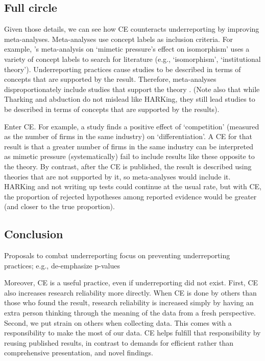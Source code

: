 \documentclass[empirical, authordate, meta]{jote-new-article}
\begin{document}
\subsection{Full circle}

Given those details, we can see how CE counteracts underreporting by improving meta-analyses. Meta-analyses use concept labels as inclusion criteria. For example, \textcite{Heugens2009}'s meta-analysis on ‘mimetic pressure's effect on isomorphism' uses a variety of concept labels to search for literature (e.g., ‘isomorphism', ‘institutional theory'). Underreporting practices cause studies to be described in terms of concepts that are supported by the result. Therefore, meta-analyses disproportionately include studies that support the theory \parencite{Murphy2019}. (Note also that while Tharking \parencite{Hollenbeck2017} and abduction \parencite{Locke2008, Schwab2017} do not mislead like HARKing, they still lead studies to be described in terms of concepts that are supported by the results). 

Enter CE. For example, a study finds a positive effect of ‘competition' (measured as the number of firms in the same industry) on ‘differentiation'. A CE for that result is that a greater number of firms in the same industry can be interpreted as mimetic pressure \parencite[][e,.,g,.]{Haveman1993}(systematically) fail to include results like these opposite to the theory. By contrast, after the CE is published, the result is described using theories that are not supported by it, so meta-analyses would include it. HARKing and not writing up tests could continue at the usual rate, but with CE, the proportion of rejected hypotheses among reported evidence would be greater (and closer to the true proportion).



\subsection{Conclusion}

Proposals to combat underreporting focus on preventing underreporting practices; e.g., de-emphasize p-values \parencite{Bettis2012, Bettis2012, Wasserstein2019, Schwab2011}

Moreover, CE is a useful practice, even if underreporting did not exist. First, CE also increases research reliability more directly. When CE is done by others than those who found the result, research reliability is increased simply by having an extra person thinking through the meaning of the data from a fresh perspective. Second, we put strain on others when collecting data. This comes with a responsibility to make the most of our data. CE helps fulfill that responsibility by reusing published results, in contrast to demands for efficient rather than comprehensive presentation, and novel findings.
\end{document}
